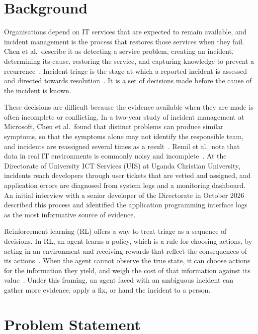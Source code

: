 \section{Background}

Organisations depend on IT services that are expected to remain available, and incident management is the process that restores those services when they fail. Chen et al.\ describe it as detecting a service problem, creating an incident, determining its cause, restoring the service, and capturing knowledge to prevent a recurrence~\cite{chen2020}. Incident triage is the stage at which a reported incident is assessed and directed towards resolution~\cite{chen2020,remil2024}. It is a set of decisions made before the cause of the incident is known.

These decisions are difficult because the evidence available when they are made is often incomplete or conflicting. In a two-year study of incident management at Microsoft, Chen et al.\ found that distinct problems can produce similar symptoms, so that the symptoms alone may not identify the responsible team, and incidents are reassigned several times as a result~\cite{chen2020}. Remil et al.\ note that data in real IT environments is commonly noisy and incomplete~\cite{remil2024}. At the Directorate of University ICT Services (UIS) at Uganda Christian University, incidents reach developers through user tickets that are vetted and assigned, and application errors are diagnosed from system logs and a monitoring dashboard. An initial interview with a senior developer of the Directorate in October 2026 described this process and identified the application programming interface logs as the most informative source of evidence.

Reinforcement learning (RL) offers a way to treat triage as a sequence of decisions. In RL, an agent learns a policy, which is a rule for choosing actions, by acting in an environment and receiving rewards that reflect the consequences of its actions~\cite{sutton2018}. When the agent cannot observe the true state, it can choose actions for the information they yield, and weigh the cost of that information against its value~\cite{kaelbling1998}. Under this framing, an agent faced with an ambiguous incident can gather more evidence, apply a fix, or hand the incident to a person.

\section{Problem Statement}

